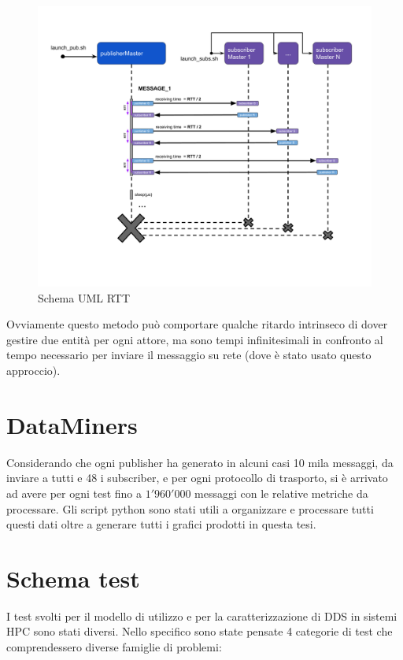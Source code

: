 \begin{figure}[H]
    \includegraphics[width=\textwidth]{./img/RTT.png}
    \caption{Schema UML RTT}\label{fig:rtt_uml}
\end{figure} 

Ovviamente questo metodo può comportare qualche ritardo intrinseco di dover gestire due entità per ogni attore, ma sono tempi infinitesimali in confronto al tempo necessario per inviare il messaggio su rete (dove è stato usato questo approccio).

\section{DataMiners}
Considerando che ogni publisher ha generato in alcuni casi 10 mila messaggi, da inviare a tutti e 48 i subscriber, e per ogni protocollo di trasporto, si è arrivato ad avere per ogni test fino a $1'960'000$ messaggi con le relative metriche da processare. 
Gli script python sono stati utili a organizzare e processare tutti questi dati oltre a generare tutti i grafici prodotti in questa tesi.

\section{Schema test}
I test svolti per il modello di utilizzo e per la caratterizzazione di DDS in sistemi HPC sono stati diversi. Nello specifico sono state pensate 4 categorie di test che comprendessero diverse famiglie di problemi:

